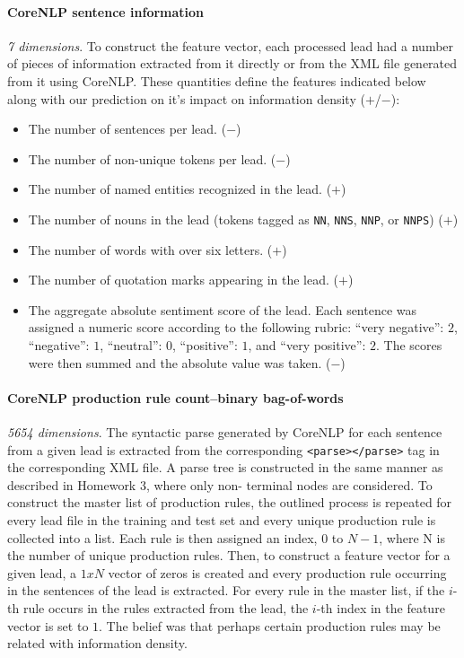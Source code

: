 \documentclass[
10pt, %
a4paper, %
oneside, %
headinclude,footinclude, %
BCOR5mm, %
]{scrartcl}
\begin{document}
\paragraph{\textbf{CoreNLP sentence information}} 
\hfill \newline \noindent \textit{7 dimensions}. To construct the feature
vector, each processed lead had a number of pieces of information extracted from
it directly or from the XML file generated from it using CoreNLP. These
quantities define the features indicated below along with our prediction on it’s
impact on information density ($+$/$-$):
\begin{itemize}
	\item The number of sentences per lead. ($-$)
	\item The number of non-unique tokens per lead. ($-$)
	\item The number of named entities recognized in the lead. ($+$)
	\item The number of nouns in the lead (tokens tagged as \texttt{NN}, \texttt{NNS}, \texttt{NNP}, or \texttt{NNPS}) ($+$)
	\item The number of words with over six letters. ($+$)
	\item The number of quotation marks appearing in the lead. ($+$)
	\item The aggregate absolute sentiment score of the lead. Each sentence was assigned a numeric score according to the following rubric: ``very negative'': $2$, ``negative'': $1$, ``neutral'': $0$, ``positive'': $1$, and ``very positive'': $2$. The scores were then summed and the absolute value was taken. ($-$)
\end{itemize}

\paragraph{\textbf{CoreNLP production rule count--binary bag-of-words}}
\hfill \newline \noindent \textit{5654 dimensions}. The syntactic parse
generated by CoreNLP for each sentence from a given lead is extracted from the
corresponding \texttt{<parse></parse>} tag in the corresponding XML file. A
parse tree is constructed in the same manner as described in Homework 3, where
only non- terminal nodes are considered. To construct the master list of
production rules, the outlined process is repeated for every lead file in the
training and test set and every unique production rule is collected into a list.
Each rule is then assigned an index, $0$ to $N-1$, where N is the number of
unique production rules. Then, to construct a feature vector for a given lead, a
$1 x N$ vector of zeros is created and every production rule occurring in the
sentences of the lead is extracted. For every rule in the master list, if the
$i$-th rule occurs in the rules extracted from the lead, the $i$-th index in the
feature vector is set to $1$. The belief was that perhaps certain production
rules may be related with information density.
\end{document}
